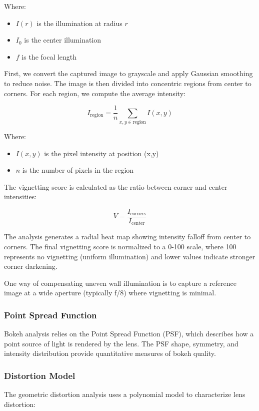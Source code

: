 Where:
\begin{itemize}
    \item \( I(r) \) is the illumination at radius \( r \)
    \item \( I_0 \) is the center illumination
    \item \( f \) is the focal length
\end{itemize}


First, we convert the captured image to grayscale and apply Gaussian smoothing to reduce noise. The image is then divided into concentric regions from center to corners. For each region, we compute the average intensity:

\begin{equation}
I_{\text{region}} = \frac{1}{n} \sum_{x,y \in \text{region}} I(x,y)
\end{equation}

Where:
\begin{itemize}
    \item \( I(x,y) \) is the pixel intensity at position (x,y)
    \item \( n \) is the number of pixels in the region
\end{itemize}

The vignetting score is calculated as the ratio between corner and center intensities:

\begin{equation}
V = \frac{I_{\text{corners}}}{I_{\text{center}}}
\end{equation}

The analysis generates a radial heat map showing intensity falloff from center to corners. The final vignetting score is normalized to a 0-100 scale, where 100 represents no vignetting (uniform illumination) and lower values indicate stronger corner darkening.

One way of compensating uneven wall illumination is to capture a reference image at a wide aperture (typically f/8) where vignetting is minimal.


\subsubsection{Point Spread Function}
Bokeh analysis relies on the Point Spread Function (PSF), which describes how a point source of light is rendered by the lens. The PSF shape, symmetry, and intensity distribution provide quantitative measures of bokeh quality.

\subsubsection{Distortion Model}
The geometric distortion analysis uses a polynomial model to characterize lens distortion:

